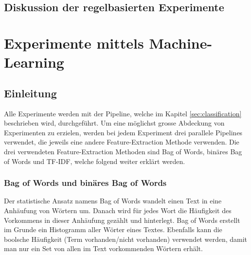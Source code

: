 \subsection{Diskussion der regelbasierten Experimente}
\section{Experimente mittels Machine-Learning}
\subsection{Einleitung}
Alle Experimente werden mit der Pipeline, welche im Kapitel \cref{sec:classification} beschrieben wird, durchgeführt.
Um eine möglichst grosse Abdeckung von Experimenten zu erzielen, werden bei jedem Experiment drei parallele Pipelines verwendet, die jeweils eine andere Feature-Extraction Methode verwenden.
Die drei verwendeten Feature-Extraction Methoden sind \glqq Bag of Words\grqq{}, \glqq binäres Bag of Words\grqq{} und \glqq TF-IDF\grqq{}, welche folgend weiter erklärt werden.
\subsubsection{Bag of Words und binäres Bag of Words}
Der statistische Ansatz namens \glqq Bag of Words\grqq{} wandelt einen Text in eine Anhäufung von Wörtern um.
Danach wird für jedes Wort die Häufigkeit des Vorkommens in dieser Anhäufung gezählt und hinterlegt.
Bag of Words erstellt im Grunde ein Histogramm aller Wörter eines Textes.
Ebenfalls kann die boolsche Häufigkeit (Term vorhanden/nicht vorhanden) verwendet werden, damit man nur ein Set von allen im Text vorkommenden Wörtern erhält.
